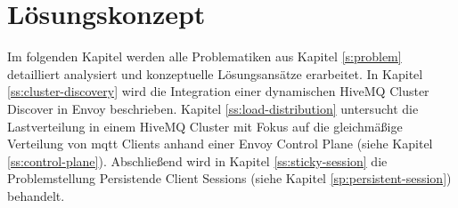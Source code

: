 \section{Lösungskonzept} \label{s:solution}
Im folgenden Kapitel werden alle Problematiken aus Kapitel \ref{s:problem} detailliert analysiert und konzeptuelle Lösungsansätze erarbeitet.
In Kapitel \ref{ss:cluster-discovery} wird die Integration einer dynamischen HiveMQ Cluster Discover in Envoy beschrieben.
Kapitel \ref{ss:load-distribution} untersucht die Lastverteilung in einem HiveMQ Cluster mit Fokus auf die gleichmä{\ss}ige Verteilung von \ac{mqtt} Clients anhand einer Envoy Control Plane (siehe Kapitel \ref{ss:control-plane}).
Abschlie{\ss}end wird in Kapitel \ref{ss:sticky-session} die Problemstellung Persistende Client Sessions (siehe Kapitel \ref{sp:persistent-session}) behandelt.

